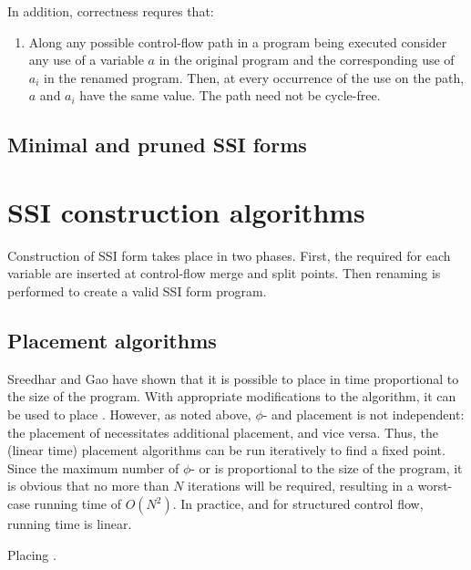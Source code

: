 In addition, correctness requres that:
\begin{enumerate}
\item Along any possible control-flow path in a program being executed
consider any use of a variable $a$ in the original program and the
corresponding use of $a_i$ in the renamed program.  Then, at every
occurrence of the use on the path, $a$ and $a_i$ have the same value.
The path need not be cycle-free.
\end{enumerate}

\subsection{Minimal and pruned SSI forms}


\section{SSI construction algorithms}

Construction of SSI form takes place in two phases.  First, the required
 for each variable are inserted at control-flow
merge and split points.  Then renaming is performed to create a valid
SSI form program.

\subsection{Placement algorithms}
Sreedhar and Gao have shown \cite{sreedhar95:lintime} that it is
possible to place  in time proportional to the size of
the program.  With appropriate modifications to the algorithm, it can
be used to place .  However, as noted above, $\phi$-
and \sigfunction{} placement is not independent: the placement of
 necessitates additional \sigfunction{} placement, and
vice versa.  Thus, the (linear time) placement algorithms can be run
iteratively to find a fixed point.  Since the maximum number of
$\phi$- or  is proportional to the size of the program,
it is obvious that no more than $N$ iterations will be required,
resulting in a worst-case running time of $O(N^2)$.  In practice, and
for structured control flow, running time is linear.

\begin{myalgorithm}\small

\caption{Placing .}\label{alg:SSIplace}
\end{myalgorithm}
